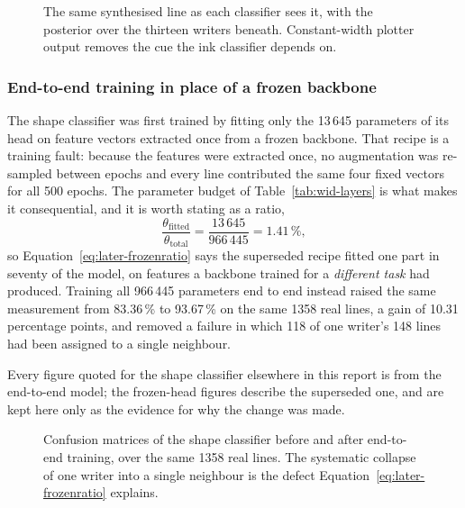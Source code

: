 \begin{figure}[htb]
\centering
{}
\caption{The same synthesised line as each classifier sees it, with the posterior over the thirteen writers beneath. Constant-width plotter output removes the cue the ink classifier depends on.}
\label{fig:later-ink-vs-shape}
\end{figure}

\subsubsection{End-to-end training in place of a frozen backbone}
\label{sec:later-endtoend}

The shape classifier was first trained by fitting only the 13\,645 parameters of its head on feature vectors extracted once from a frozen backbone. That recipe is a training fault: because the features were extracted once, no augmentation was re-sampled between epochs and every line contributed the same four fixed vectors for all 500 epochs. The parameter budget of Table~\ref{tab:wid-layers} is what makes it consequential, and it is worth stating as a ratio,
\begin{equation}
\frac{\theta_{\mathrm{fitted}}}{\theta_{\mathrm{total}}}=\frac{13\,645}{966\,445}=1.41\,\%,
\label{eq:later-frozenratio}
\end{equation}
so Equation~\ref{eq:later-frozenratio} says the superseded recipe fitted one part in seventy of the model, on features a backbone trained for a \emph{different task} had produced. Training all 966\,445 parameters end to end instead raised the same measurement from 83.36\,\% to 93.67\,\% on the same 1358 real lines, a gain of 10.31 percentage points, and removed a failure in which 118 of one writer's 148 lines had been assigned to a single neighbour.

Every figure quoted for the shape classifier elsewhere in this report is from the end-to-end model; the frozen-head figures describe the superseded one, and are kept here only as the evidence for why the change was made.

\begin{figure}[htb]
\centering
{}
\caption{Confusion matrices of the shape classifier before and after end-to-end training, over the same 1358 real lines. The systematic collapse of one writer into a single neighbour is the defect Equation~\ref{eq:later-frozenratio} explains.}
\label{fig:later-frozen-vs-e2e}
\end{figure}

